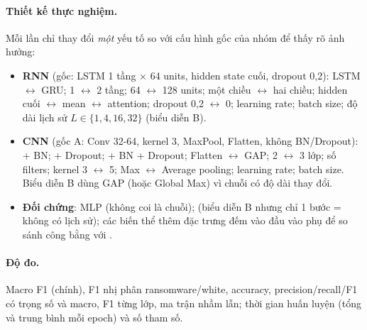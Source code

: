 \paragraph{Thiết kế thực nghiệm.} Mỗi lần chỉ thay đổi \emph{một} yếu tố so với cấu hình gốc của nhóm để thấy rõ ảnh hưởng:
\begin{itemize}
\item \textbf{RNN} (gốc: LSTM 1 tầng $\times$ 64 units, hidden state cuối, dropout 0,2): LSTM $\leftrightarrow$ GRU; 1 $\leftrightarrow$ 2 tầng;
  64 $\leftrightarrow$ 128 units; một chiều $\leftrightarrow$ hai chiều; hidden cuối $\leftrightarrow$ mean $\leftrightarrow$ attention;
  dropout 0,2 $\leftrightarrow$ 0; learning rate; batch size; độ dài lịch sử $L\in\{1,4,16,32\}$ (biểu diễn B).
\item \textbf{CNN} (gốc A: Conv 32-64, kernel 3, MaxPool, Flatten, không BN/Dropout): + BN; + Dropout; + BN + Dropout;
  Flatten $\leftrightarrow$ GAP; 2 $\leftrightarrow$ 3 lớp; số filters; kernel 3 $\leftrightarrow$ 5; Max $\leftrightarrow$ Average pooling;
  learning rate; batch size. Biểu diễn B dùng GAP (hoặc Global Max) vì chuỗi có độ dài thay đổi.
\item \textbf{Đối chứng}: MLP (không coi là chuỗi);  (biểu diễn B nhưng chỉ 1 bước = không có lịch sử);
  các biến thể  thêm đặc trưng đếm vào đầu vào phụ để so sánh công bằng với .
\end{itemize}

\paragraph{Độ đo.} Macro F1 (chính), F1 nhị phân ransomware/white, accuracy, precision/recall/F1 có trọng số và macro, F1 từng lớp,
ma trận nhầm lẫn; thời gian huấn luyện (tổng và trung bình mỗi epoch) và số tham số.
